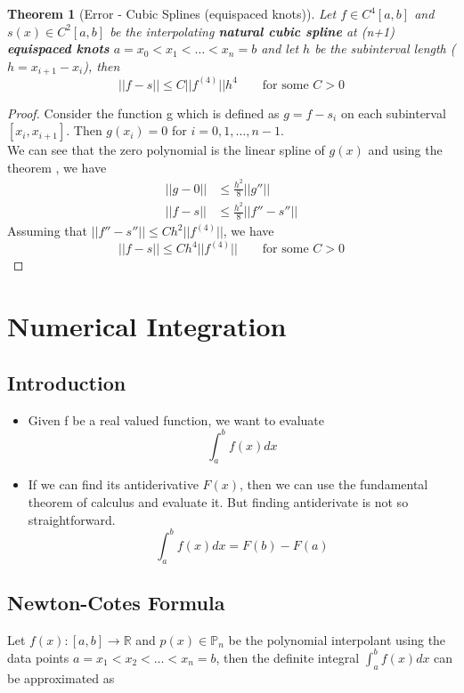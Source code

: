 \documentclass{article}
\newtheorem*{theorem}{Theorem}
\begin{document}
	\begin{theorem}[Error - Cubic Splines (equispaced knots)]
		Let $f\in C^4[a,b]$ and $s(x) \in C^2[a,b]$ be the interpolating \textbf{natural cubic spline} at (n+1) \textbf{equispaced knots} $a=x_0<x_1<\hdots<x_n=b$ and let $h$ be the subinterval length ($h=x_{i+1}-x_i$), then
			\[\boxed{||f-s|| \leq C||f^{(4)}|| h^4 \qquad \text{for some } C>0 }\] 
	\end{theorem}
	\begin{proof}
		Consider the function g which is defined as $g=f-s_i$ on each subinterval $[x_i,x_{i+1}]$.
		Then $g(x_i)=0$ for $i=0,1,\hdots,n-1$.\\
		We can see that the zero polynomial is the linear spline of $g(x)$ and using the theorem , we have
		\begin{align*}
			||g-0|| &\leq \frac{h^2}{8} ||g''||\\
            ||f-s|| &\leq \frac{h^2}{8} ||f'' - s''||
		\end{align*}
		Assuming that $||f''-s''||\leq C h^2 ||f^{(4)}||$, we have
		\[||f-s|| \leq C h^4 ||f^{(4)}|| \qquad \text{for some } C> 0\]
		
	\end{proof}






\section{Numerical Integration}
	\subsection{Introduction}
		\begin{itemize}
			\item Given f be a real valued function, we want to evaluate 
			\[\int_a^b f(x) dx\]

			\item If we can find its antiderivative $F(x)$, then we can use the fundamental theorem of calculus and evaluate it. But finding antiderivate is not so straightforward.
			\[\int_a^b f(x) dx = F(b) - F(a)\]
		\end{itemize}

	\subsection{Newton-Cotes Formula}
		Let $f(x):[a,b]\rightarrow \mathbb{R}$ and $p(x) \in \mathbb{P}_n$ be the polynomial interpolant using the data points $a=x_1<x_2<\hdots<x_n=b$, then the definite integral $\int_a^b f(x) dx$ can be approximated as 
\end{document}
